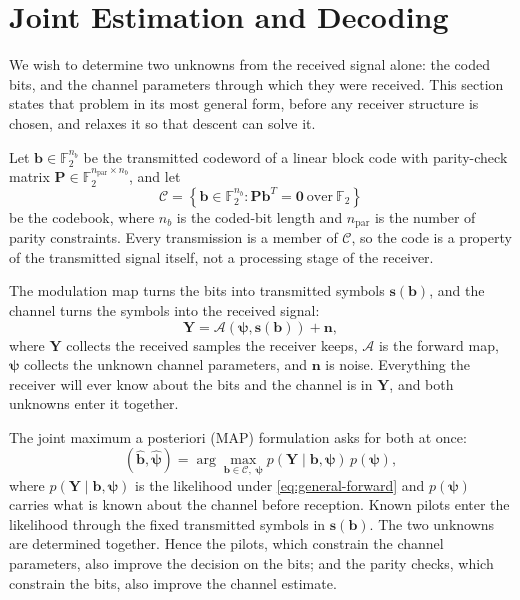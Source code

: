 \documentclass[conference]{IEEEtran}
\newcommand{\Ftwo}{\mathbb{F}_2}
\begin{document}
\section{Joint Estimation and Decoding}

We wish to determine two unknowns from the received signal alone: the
coded bits, and the channel parameters through which they were
received.  This section states that problem in its most general form, before
any receiver structure is chosen, and relaxes it so that descent can solve
it.

Let \(\mathbf b\in\Ftwo^{n_b}\) be the transmitted codeword of a linear
block code with parity-check matrix
\(\mathbf P\in\Ftwo^{n_{\mathrm{par}}\times n_b}\), and
let
\begin{equation}
  \mathcal C=\left\{\mathbf b\in\Ftwo^{n_b}:\mathbf P\mathbf b^{T}=\mathbf 0
  \ \text{over}\ \Ftwo\right\}
  \label{eq:codebook}
\end{equation}
be the codebook, where \(n_b\) is the coded-bit length and
\(n_{\mathrm{par}}\) is the number of parity constraints.  Every transmission is a member of
\(\mathcal C\), so the code is a property of the transmitted signal itself,
not a processing stage of the receiver.

The modulation map turns the bits into transmitted symbols
\(\mathbf s(\mathbf b)\), and the channel turns the symbols into
the received signal:
\begin{equation}
  \mathbf Y=\mathcal A\!\left(\bm\psi,\mathbf s(\mathbf b)\right)+\mathbf n,
  \label{eq:general-forward}
\end{equation}
where \(\mathbf Y\) collects the received samples the receiver keeps,
\(\mathcal A\) is the forward map, \(\bm\psi\) collects the unknown channel
parameters, and \(\mathbf n\) is noise.  Everything the receiver will ever
know about the bits and the channel is in \(\mathbf Y\), and both unknowns
enter it together.

The joint maximum a posteriori (MAP) formulation asks for both at once:
\begin{equation}
  (\widehat{\mathbf b},\widehat{\bm\psi})
  =
  \arg\max_{\mathbf b\in\mathcal C,\;\bm\psi}
  p(\mathbf Y\mid\mathbf b,\bm\psi)\,p(\bm\psi),
  \label{eq:general-map}
\end{equation}
where \(p(\mathbf Y\mid\mathbf b,\bm\psi)\) is the likelihood under
\eqref{eq:general-forward} and \(p(\bm\psi)\) carries what is known about
the channel before reception.  Known pilots enter the likelihood through the
fixed transmitted symbols in \(\mathbf s(\mathbf b)\).  The two unknowns are
determined together.  Hence the pilots, which constrain the channel
parameters, also improve the decision on the bits; and the parity checks,
which constrain the bits, also improve the channel estimate.
\end{document}
